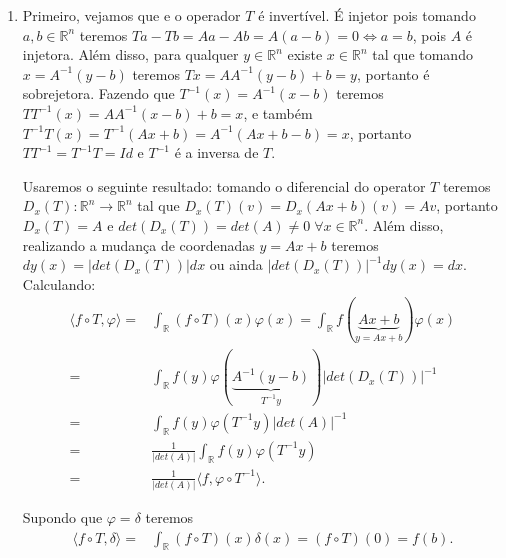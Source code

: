 \documentclass{article}
\begin{document}
\begin{enumerate}
\begin{enumerate}
				\item Primeiro, vejamos que e o operador $T$ é invertível. É injetor pois tomando $a, b \in \mathbb{R}^{n}$ teremos $Ta- Tb = Aa - Ab = A(a-b) = 0 \iff a=b$, pois $A$ é injetora. Além disso, para qualquer $y \in \mathbb{R}^{n}$ existe $x \in \mathbb{R}^{n}$ tal que tomando $x = A^{-1}(y -b)$ teremos $Tx = AA^{-1}(y -b) + b = y$, portanto é sobrejetora. Fazendo que $T^{-1}(x) = A^{-1}(x - b)$ teremos $TT^{-1}(x) = AA^{-1}(x - b) + b = x$, e também $T^{-1}T(x) = T^{-1}(Ax + b) = A^{-1}(Ax+b - b) = x$, portanto $TT^{-1} = T^{-1}T = Id$ e $T^{-1}$ é a inversa de $T$.
				
				Usaremos o seguinte resultado: tomando o diferencial do operator $T$ teremos $D_{x}(T): \mathbb{R}^{n} \to \mathbb{R}^{n}$ tal que $D_{x}(T)(v) = D_{x}(Ax+b)(v) = Av$, portanto $D_{x}(T) = A$ e $det(D_{x}(T)) = det(A) \neq 0 \; \forall x \in \mathbb{R}^{n}$. Além disso, realizando a mudança de coordenadas $y = Ax+b$ teremos $dy(x) = |det(D_{x}(T))|dx$ ou ainda $|det(D_{x}(T))|^{-1} dy(x) = dx$. Calculando:
				$$
				\begin{aligned}
				\langle f \circ T, \varphi \rangle = & \int_{\mathbb{R}} (f \circ T)(x)\varphi(x)
				= \int_{\mathbb{R}} f(\underbrace{ Ax+b }_{y = Ax+b})\varphi(x)
				\\
				= & \int_{\mathbb{R}} f(y)\varphi(\underbrace{ A^{-1}(y - b)}_{T^{-1}y} ) \Big| det(D_{x}(T)) \Big|^{-1}
				\\
				= & \int_{\mathbb{R}} f(y)\varphi(T^{-1}y)  |det(A)|^{-1}
				\\
				= & \frac{1}{|det(A)|} \int_{\mathbb{R}} f(y)\varphi(T^{-1}y)
				\\
				= & \frac{1}{|det(A)|} \langle f, \varphi \circ T^{-1}\rangle.
				\end{aligned}
				$$
				
				Supondo que $\varphi = \delta$ teremos
				$$
				\begin{aligned}
				\langle f \circ T, \delta \rangle = & \int_{\mathbb{R}} (f \circ T)(x)\delta(x)
				= (f \circ T)(0) = f(b).
				\\
				\end{aligned}
				$$
			
			\end{enumerate}
		

\end{enumerate}
\end{document}
